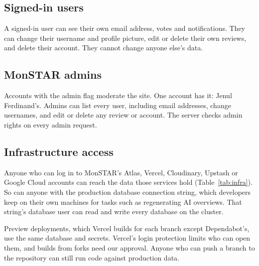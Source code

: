 \documentclass[11pt,a4paper]{article}
\begin{document}
\subsection{Signed-in users}

A signed-in user can see their own email address, votes and notifications.
They can change their username and profile picture, edit or delete their own
reviews, and delete their account.  They cannot change anyone else's data.

\subsection{MonSTAR admins}

Accounts with the admin flag moderate the site.  One account has it: Jenul
Ferdinand's.  Admins can list every user, including email addresses, change
usernames, and edit or delete any review or account.  The server checks admin
rights on every admin request.

\subsection{Infrastructure access}
\label{sec:infra}

Anyone who can log in to MonSTAR's Atlas, Vercel, Cloudinary, Upstash or
Google Cloud accounts can reach the data those services hold
(Table~\ref{tab:infra}).  So can anyone with the production database
connection string, which developers keep on their own machines for tasks such
as regenerating AI overviews.  That string's database user can read and write
every database on the cluster.

Preview deployments, which Vercel builds for each branch except Dependabot's,
use the same database and secrets.  Vercel's login protection limits who can open them, and
builds from forks need our approval.  Anyone who can push a branch to the
repository can still run code against production data.
\end{document}
